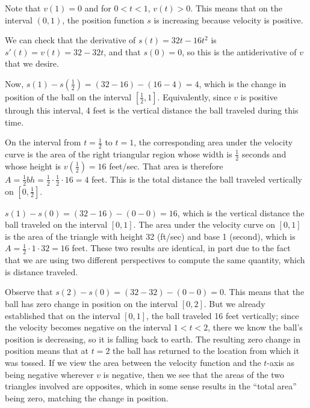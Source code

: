 \begin{activitySolution}
\ba
	\item Note that $v(1) = 0$ and for $0 < t < 1$, $v(t) > 0$.  This means that on the interval $(0,1)$, the position function $s$ is increasing because velocity is positive.
	\item We can check that the derivative of $s(t) = 32t - 16t^2$ is $s'(t) = v(t) = 32 - 32t$, and that $s(0) = 0$, so this is the antiderivative of $v$ that we desire.
	\item Now, $s(1) - s(\frac{1}{2}) = (32 - 16) - (16 - 4) = 4$, which is the change in position of the ball on the interval $[\frac{1}{2},1]$.  Equivalently, since $v$ is positive through this interval, 4 feet is the vertical distance the ball traveled during this time.
	\item On the interval from $t = \frac{1}{2}$ to $t = 1$, the corresponding area under the velocity curve is the area of the right triangular region whose width is $\frac{1}{2}$ seconds and whose height is $v(\frac{1}{2}) = 16$ feet/sec.  That area is therefore $A = \frac{1}{2} bh = \frac{1}{2} \cdot \frac{1}{2} \cdot 16 = 4$ feet.  This is the total distance the ball traveled vertically on $[0,\frac{1}{2}]$.
	\item $s(1) - s(0) = (32 - 16) - (0-0) = 16$, which is the vertical distance the ball traveled on the interval $[0,1]$.  The area under the velocity curve on $[0,1]$ is the area of the triangle with height 32 (ft/sec) and base 1 (second), which is $A = \frac{1}{2} \cdot 1 \cdot 32 = 16$ feet.  These two results are identical, in part due to the fact that we are using two different perspectives to compute the same quantity, which is distance traveled.
	\item Observe that $s(2) - s(0) = (32 - 32) - (0 - 0) = 0$.  This means that the ball has zero change in position on the interval $[0,2]$.  But we already established that on the interval $[0,1]$, the ball traveled 16 feet vertically; since the velocity becomes negative on the interval $1 < t < 2$, there we know the ball's position is decreasing, so it is falling back to earth.  The resulting zero change in position means that at $t = 2$ the ball has returned to the location from which it was tossed.  If we view the area between the velocity function and the $t$-axis as being negative wherever $v$ is negative, then we see that the areas of the two triangles involved are opposites, which in some sense results in the ``total area'' being zero, matching the change in position.
\ea
\end{activitySolution}
\aftera